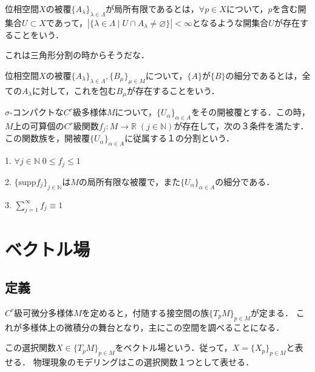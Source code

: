 \documentclass[uplatex, dvipdfmx]{jsreport}
\begin{document}
\begin{definition}
    位相空間$X$の被覆$\{A_\lambda\}_{\lambda\in\Lambda}$が局所有限であるとは，$\forall p\in X$について，$p$を含む開集合$U\subset X$であって，$|\{ \lambda\in\Lambda\mid U\cap A_\lambda\ne\varnothing \}|<\infty$となるような開集合$U$が存在することをいう．
\end{definition}
これは三角形分割の時からそうだな．

\begin{definition}
    位相空間$X$の被覆$\{A_\lambda\}_{\lambda\in\Lambda},\{B_\mu\}_{\mu\in M}$について，$\{A\}$が$\{B\}$の細分であるとは，全ての$A_\lambda$に対して，これを包む$B_\mu$が存在することをいう．
\end{definition}

\begin{theorem}[1の分割]
    $\sigma$-コンパクトな$C^r$級多様体$M$について，$\{U_\alpha\}_{\alpha\in A}$をその開被覆とする．この時，$M$上の可算個の$C^r$級関数$f_j:M\to\mathbb{R}\; (j\in\mathbb{N})$が存在して，次の３条件を満たす．この関数族を，開被覆$\{U_\alpha\}_{\alpha\in A}$に従属する１の分割という．

    1. $\forall j\in\mathbb{N}\; 0\le f_j\le 1$

    2. $\{\mathrm{supp}f_j\}_{j\in\mathbb{N}}$は$M$の局所有限な被覆で，また$\{U_\alpha\}_{\alpha\in A}$の細分である．

    3. $\sum^\infty_{j=1}f_j\equiv 1$
\end{theorem}

\chapter{ベクトル場}

\section{定義}

\begin{screen}
    \begin{definition}
        $C^r$級可微分多様体$M$を定めると，付随する接空間の族$\{T_pM\}_{p\in M}$が定まる．
        これが多様体上の微積分の舞台となり，主にこの空間を調べることになる．

        この選択関数$X\in \{T_pM\}_{p\in M}$をベクトル場という．従って，$X=\{X_p\}_{p\in M}$と表せる．
        物理現象のモデリングはこの選択関数１つとして表せる．
    \end{definition}
\end{screen}
\end{document}

